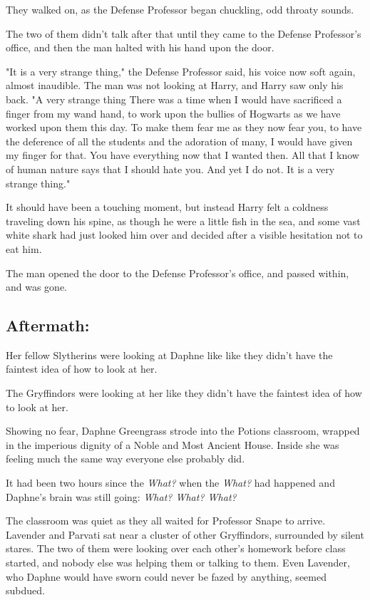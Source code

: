 They walked on, as the Defense Professor began chuckling, odd throaty sounds.

The two of them didn't talk after that until they came to the Defense
Professor's office, and then the man halted with his hand upon the door.

"It is a very strange thing," the Defense Professor said, his voice now soft
again, almost inaudible. The man was not looking at Harry, and Harry saw only
his back. "A very strange thing{\el} There was a time when I would have
sacrificed a finger from my wand hand, to work upon the bullies of Hogwarts as
we have worked upon them this day. To make them fear me as they now fear you,
to have the deference of all the students and the adoration of many, I would
have given my finger for that. You have everything now that I wanted then. All
that I know of human nature says that I should hate you. And yet I do not. It
is a very strange thing."

It should have been a touching moment, but instead Harry felt a coldness
traveling down his spine, as though he were a little fish in the sea, and some
vast white shark had just looked him over and decided after a visible
hesitation not to eat him.

The man opened the door to the Defense Professor's office, and passed within, and
was gone.
\sbreak
\vspace{-2\baselineskip}
\subsection{Aftermath:}

Her fellow Slytherins were looking at Daphne like{\el} like they didn't have
the faintest idea of how to look at her.

The Gryffindors were looking at her like they didn't have the faintest idea of
how to look at her.

Showing no fear, Daphne Greengrass strode into the Potions classroom, wrapped
in the imperious dignity of a Noble and Most Ancient House. Inside she was
feeling much the same way everyone else probably did.

It had been two hours since the \emph{What?} when the \emph{What?} had happened
and Daphne's brain was still going: \emph{What? What? What?}

The classroom was quiet as they all waited for Professor Snape to arrive.
Lavender and Parvati sat near a cluster of other Gryffindors, surrounded by
silent stares. The two of them were looking over each other's homework before
class started, and nobody else was helping them or talking to them. Even
Lavender, who Daphne would have sworn could never be fazed by anything, seemed
subdued.

